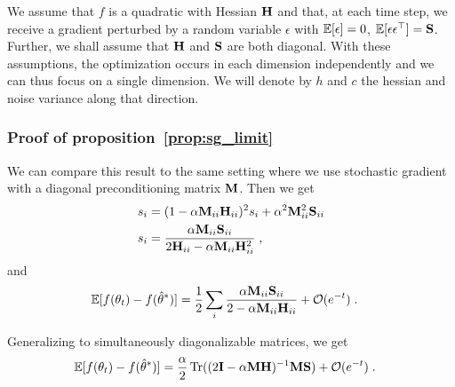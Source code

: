 We assume that $f$ is a quadratic with Hessian ${\mathbf{H}}$ and that, at each time step, we receive a gradient perturbed by a random variable $\epsilon$ with $\mathbb{E}[\epsilon] = 0$, $\mathbb{E}[\epsilon \epsilon^\top] = {\mathbf{S}}$.
Further, we shall assume that ${\mathbf{H}}$ and ${\mathbf{S}}$ are both diagonal. With these assumptions, the optimization occurs in each dimension independently and we can thus focus on a single dimension. We will denote by $h$ and $c$ the hessian and noise variance along that direction.

\subsubsection{Proof of proposition~\ref{prop:sg_limit}}
We can compare this result to the same setting where we use stochastic gradient with a diagonal preconditioning matrix ${\mathbf{M}}$. Then we get
\begin{align*}
    s_i     &= (1 - \alpha {\mathbf{M}}_{ii}{\mathbf{H}}_{ii})^2 s_i + \alpha^2 {\mathbf{M}}_{ii}^2 {\mathbf{S}}_{ii}\\
    s_i     &= \frac{\alpha {\mathbf{M}}_{ii} {\mathbf{S}}_{ii}}{2 {\mathbf{H}}_{ii} - \alpha {\mathbf{M}}_{ii}{\mathbf{H}}_{ii}^2}\; ,
\end{align*}
and
\begin{align*}
    \mathbb{E}[f(\theta_t) - f(\hat\theta^\ast)]    &= \frac{1}{2} \sum_i\frac{\alpha {\mathbf{M}}_{ii} {\mathbf{S}}_{ii}}{2 - \alpha {\mathbf{M}}_{ii}{\mathbf{H}}_{ii}} + {\mathcal{O}}(e^{-t}) \; .
\end{align*}

Generalizing to simultaneously diagonalizable matrices, we get
\begin{align*}
    \mathbb{E}[f(\theta_t) - f(\hat\theta^\ast)]    &= \frac{\alpha}{2} \operatorname{Tr}((2{\mathbf{I}} - \alpha {\mathbf{M}}{\mathbf{H}})^{-1} {\mathbf{M}}{\mathbf{S}}) + {\mathcal{O}}(e^{-t}) \; .
\end{align*}

